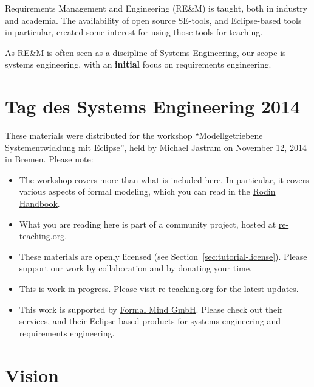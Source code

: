 Requirements Management and Engineering (RE\&M) is taught, both in industry and academia. The availability of open source SE-tools, and Eclipse-based tools in particular, created some interest for using those tools for teaching. 

As RE\&M is often seen as a discipline of Systems Engineering, our scope is systems engineering, with an \textbf{initial} focus on requirements engineering.

\section{Tag des Systems Engineering 2014}

These materials were distributed for the workshop ``Modellgetriebene Systementwicklung mit Eclipse'', held by Michael Jastram on November 12, 2014 in Bremen.  Please note:

\begin{itemize}
\item The workshop covers more than what is included here.  In particular, it covers various aspects of formal modeling, which you can read in the \href{http://formalmind.com/de/blog/rodin-handbook-now-available-print}{Rodin Handbook}.
\item What you are reading here is part of a community project, hosted at \href{http://re-teaching.org}{re-teaching.org}.
\item These materials are openly licensed (see Section~\ref{sec:tutorial-license}).  Please support our work by collaboration and by donating your time.
\item This is work in progress.  Please visit \href{http://re-teaching.org}{re-teaching.org} for the latest updates.
\item This work is supported by \href{http://formalmind.com}{Formal Mind GmbH}.  Please check out their services, and their Eclipse-based products for systems engineering and requirements engineering.
\end{itemize}

\section{Vision}

